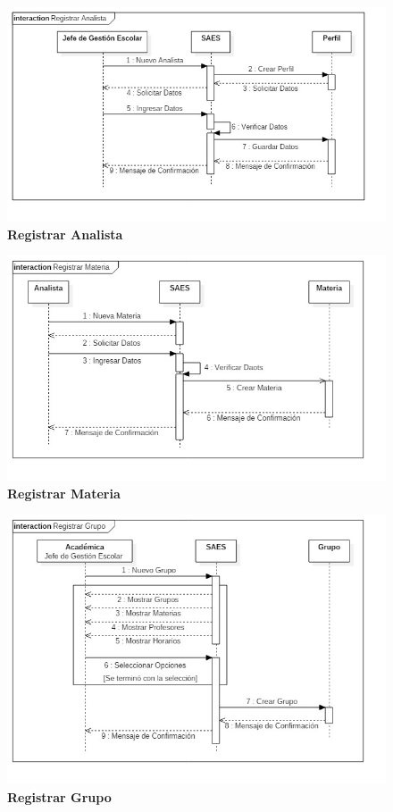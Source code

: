 \begin{figure}[H]
  \centering
    \includegraphics[scale=0.7]{project/Secuencia/Registrar_Analista.jpg}
  \caption{\textbf{Registrar Analista}}
\end{figure}
\begin{figure}[H]
  \centering
    \includegraphics[scale=0.7]{project/Secuencia/Registrar_Materia.jpg}
  \caption{\textbf{Registrar Materia}}
\end{figure}
\begin{figure}[H]
  \centering
    \includegraphics[scale=0.7]{project/Secuencia/Registrar_Grupo.jpg}
  \caption{\textbf{Registrar Grupo}}
\end{figure}
